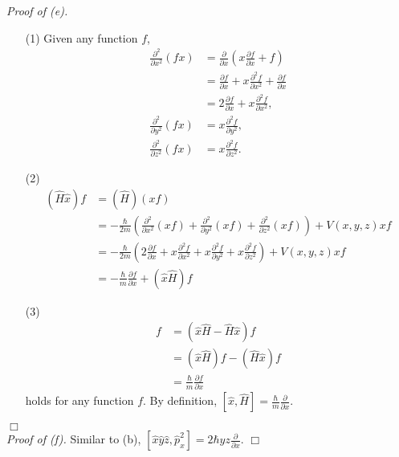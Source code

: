 \documentclass{article}
\begin{document}
\emph{Proof of (e).}
\begin{enumerate}
\item[(1)]
Given any function $f$,
\begin{align*}
\frac{\partial^2}{\partial x^2}(fx)
&= \frac{\partial}{\partial x}\left( x\frac{\partial f}{\partial x} + f \right) \\
&= \frac{\partial f}{\partial x} + x\frac{\partial^2 f}{\partial x^2}
  + \frac{\partial f}{\partial x} \\
&= 2\frac{\partial f}{\partial x} + x\frac{\partial^2 f}{\partial x^2}, \\
\frac{\partial^2}{\partial y^2}(fx)
&= x \frac{\partial^2 f}{\partial y^2}, \\
\frac{\partial^2}{\partial z^2}(fx)
&= x \frac{\partial^2 f}{\partial z^2}.
\end{align*}
\item[(2)]
\begin{align*}
(\hat{H}\hat{x})f
&= (\hat{H})(xf) \\
&= -\frac{\hbar}{2m}
    \left(
      \frac{\partial^2}{\partial x^2}(xf)
      + \frac{\partial^2}{\partial y^2}(xf)
      + \frac{\partial^2}{\partial z^2}(xf)
    \right) + V(x,y,z)xf \\
&= -\frac{\hbar}{2m}
    \left(
      2 \frac{\partial f}{\partial x} + x\frac{\partial^2 f}{\partial x^2}
      + x \frac{\partial^2 f}{\partial y^2}
      + x \frac{\partial^2 f}{\partial z^2}
    \right) + V(x,y,z)xf \\
&= -\frac{\hbar}{m} \frac{\partial f}{\partial x} + (\hat{x}\hat{H})f
\end{align*}
\item[(3)]
\begin{align*}
[\hat{x}, \hat{H}]f
&= (\hat{x}\hat{H} - \hat{H} \hat{x})f \\
&= (\hat{x}\hat{H})f - (\hat{H}\hat{x})f \\
&= \frac{\hbar}{m} \frac{\partial f}{\partial x}
\end{align*}
holds for any function $f$.
By definition,
$[\hat{x}, \hat{H}] = \frac{\hbar}{m} \frac{\partial}{\partial x}$.
\end{enumerate}
$\Box$ \\

\emph{Proof of (f).}
Similar to (b),
$[\hat{x}\hat{y}\hat{z}, \hat{p}_x^2] = 2 \hbar yz \frac{\partial}{\partial x}$.
$\Box$ \\\\
\end{document}
